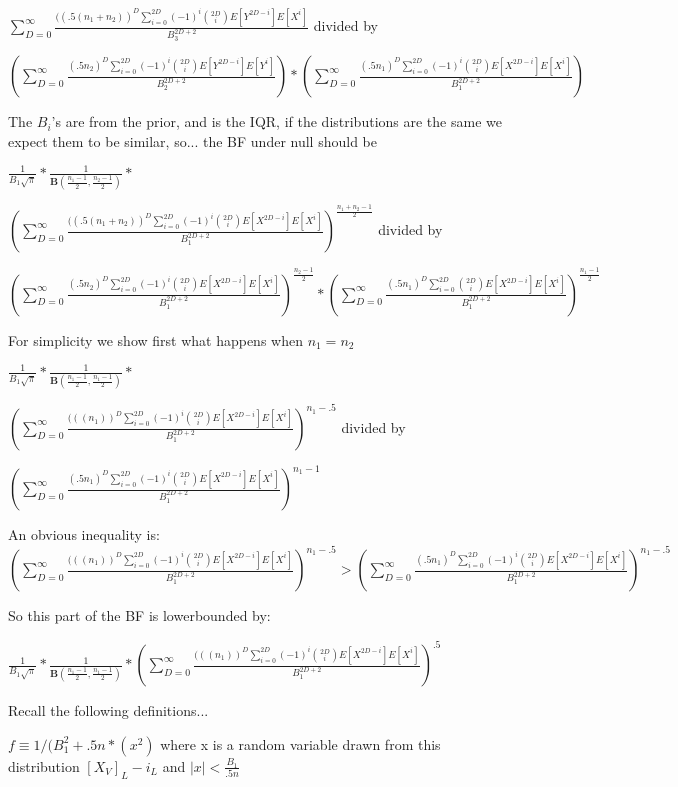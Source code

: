 \documentclass[11pt]{article}
\begin{document}
$\sum_{D=0}^\infty \frac{((.5(n_1 + n_2))^D \sum_{i=0}^{2D} (-1)^i \binom{2D}{i}E[Y^{2D-i}]E[X^{i}]}{B_3^{2D+2}}$ divided by 


$ (\sum_{D=0}^\infty \frac{(.5n_2)^D \sum_{i=0}^{2D} (-1)^i \binom{2D}{i}E[Y^{2D-i}]E[Y^{i}]}{B_2^{2D+2}}) * (\sum_{D=0}^\infty \frac{(.5n_1)^D \sum_{i=0}^{2D} (-1)^i \binom{2D}{i}E[X^{2D-i}]E[X^{i}]}{B_1^{2D+2}}) $

The $B_i$'s are from the prior, and is the IQR, if the distributions are the same we expect them to be similar, so... the BF under null should be

$\frac{1}{B_1 \sqrt{\pi}} * \frac{1}{ \mathbf{B}(\frac{n_1 -1}{2}, \frac{n_2 -1}{2})} * $

$(\sum_{D=0}^\infty \frac{((.5(n_1 + n_2))^D \sum_{i=0}^{2D} (-1)^i \binom{2D}{i}E[X^{2D-i}]E[X^{i}]}{B_1^{2D+2}})^{\frac{n_1+n_2 - 1}{2}}$ divided by 


$ (\sum_{D=0}^\infty \frac{(.5n_2)^D \sum_{i=0}^{2D} (-1)^i \binom{2D}{i}E[X^{2D-i}]E[X^{i}]}{B_1^{2D+2}})^{\frac{n_2 - 1}{2}} * (\sum_{D=0}^\infty \frac{(.5n_1)^D \sum_{i=0}^{2D} \binom{2D}{i}E[X^{2D-i}]E[X^{i}]}{B_1^{2D+2}})^{\frac{n_1 - 1}{2}} $

For simplicity we show first what happens when $n_1 = n_2$

$\frac{1}{B_1 \sqrt{\pi}} * \frac{1}{ \mathbf{B}(\frac{n_1 -1}{2}, \frac{n_1 -1}{2})} * $

$(\sum_{D=0}^\infty \frac{(((n_1))^D \sum_{i=0}^{2D} (-1)^i \binom{2D}{i}E[X^{2D-i}]E[X^{i}]}{B_1^{2D+2}})^{n_1- .5}$ divided by 

$ (\sum_{D=0}^\infty \frac{(.5n_1)^D \sum_{i=0}^{2D} (-1)^i \binom{2D}{i}E[X^{2D-i}]E[X^{i}]}{B_1^{2D+2}})^{n_1- 1} $

An obvious inequality is: $(\sum_{D=0}^\infty \frac{(((n_1))^D \sum_{i=0}^{2D} (-1)^i \binom{2D}{i}E[X^{2D-i}]E[X^{i}]}{B_1^{2D+2}})^{n_1- .5} > (\sum_{D=0}^\infty \frac{(.5n_1)^D \sum_{i=0}^{2D} (-1)^i \binom{2D}{i}E[X^{2D-i}]E[X^{i}]}{B_1^{2D+2}})^{n_1- .5} $

So this part of the BF is lowerbounded by:

$\frac{1}{B_1 \sqrt{\pi}} * \frac{1}{ \mathbf{B}(\frac{n_1 -1}{2}, \frac{n_1 -1}{2})} * (\sum_{D=0}^\infty \frac{(((n_1))^D \sum_{i=0}^{2D} (-1)^i \binom{2D}{i}E[X^{2D-i}]E[X^{i}]}{B_1^{2D+2}})^{.5} $

Recall the following definitions...

$f \equiv 1 / (B_1^2 + .5n*(x^2)$ where x is a random variable drawn from this distribution $[X_V]_{L} - i_L$ and $|x| < \frac{B_1}{.5n}$  
\end{document}
